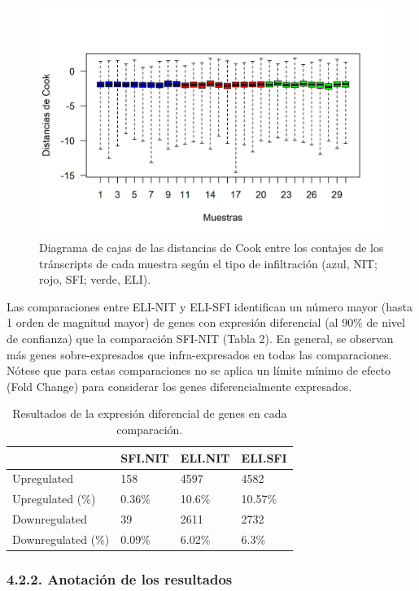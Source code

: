 \documentclass[
]{article}
\begin{document}
\begin{figure}

{\centering \includegraphics[width=0.8\linewidth]{results/3.ExpresionDiferencial/1.Outl} 

}

\caption{Diagrama de cajas de las distancias de Cook entre los contajes de los tránscripts de cada muestra según el tipo de infiltración (azul, NIT; rojo, SFI; verde, ELI).}\label{fig:Fig6}
\end{figure}

Las comparaciones entre ELI-NIT y ELI-SFI identifican un número mayor
(hasta 1 orden de magnitud mayor) de genes con expresión diferencial (al
\(90\%\) de nivel de confianza) que la comparación SFI-NIT (Tabla 2). En
general, se observan más genes sobre-expresados que infra-expresados en
todas las comparaciones. Nótese que para estas comparaciones no se
aplica un límite mínimo de efecto (Fold Change) para considerar los
genes diferencialmente expresados.

\begin{table}

\caption{\label{tab:unnamed-chunk-2}Resultados de la expresión diferencial de genes en cada comparación.}
\centering
\begin{tabular}[t]{llll}
\toprule
  & SFI.NIT & ELI.NIT & ELI.SFI\\
\midrule
Upregulated & 158 & 4597 & 4582\\
Upregulated (\%) & 0.36\% & 10.6\% & 10.57\%\\
Downregulated & 39 & 2611 & 2732\\
Downregulated (\%) & 0.09\% & 6.02\% & 6.3\%\\
\bottomrule
\end{tabular}
\end{table}

\hypertarget{anotaciuxf3n-de-los-resultados-1}{%
\subsubsection{4.2.2. Anotación de los
resultados}\label{anotaciuxf3n-de-los-resultados-1}}
\end{document}
